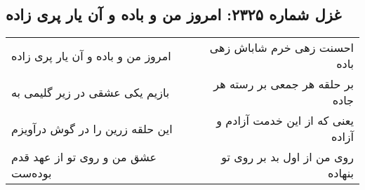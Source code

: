 \begin{center}
\section*{غزل شماره ۲۳۲۵: امروز من و باده و آن یار پری زاده}
\label{sec:2325}
\begin{longtable}{l p{0.5cm} r}
امروز من و باده و آن یار پری زاده
&&
احسنت زهی خرم شاباش زهی باده
\\
بازیم یکی عشقی در زیر گلیمی به
&&
بر حلقه هر جمعی بر رسته هر جاده
\\
این حلقه زرین را در گوش درآویزم
&&
یعنی که از این خدمت آزادم و آزاده
\\
عشق من و روی تو از عهد قدم بوده‌ست
&&
روی من از اول بد بر روی تو بنهاده
\\
\end{longtable}
\end{center}
